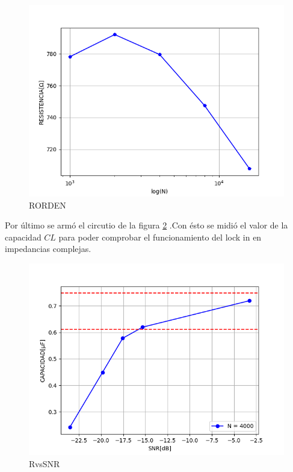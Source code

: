 \documentclass[11pt,a4paper]{extarticle}
\begin{document}
\begin{multicols}{2}
\begin{figure}[H]
	\centering
	\includegraphics[width=\linewidth]{Images/RORDEN.png}
	\caption{RORDEN}
	\label{fig:RORDEN}
\end{figure}

Por último se armó el circutio de la figura 
\ref{fig:CvsSNR} .Con ésto 
se midió el valor de la capacidad $CL$ para poder 
comprobar el funcionamiento del lock in en 
impedancias complejas.\\ 

\begin{figure}[H]
	\centering
	\includegraphics[width=\linewidth]{Images/CvsSNR(segunda).png}
	\caption{RvsSNR}
	\label{fig:CvsSNR}
\end{figure}



\end{multicols}
\end{document}
